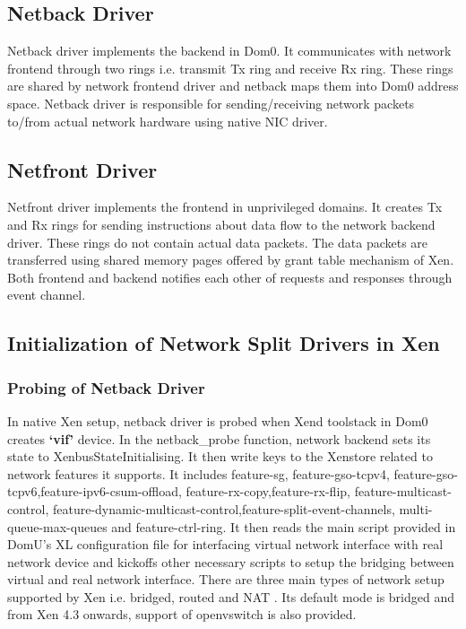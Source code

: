 \subsection{Netback Driver \label{sec:netback}}
Netback driver implements the backend in Dom0. It communicates with network frontend through two rings i.e. transmit Tx ring and receive Rx ring. These rings are shared by network frontend driver and netback maps them into Dom0 address space. Netback driver is responsible for sending/receiving network packets to/from actual network hardware using native NIC driver. 

\subsection{Netfront Driver \label{sec:netfront}}
Netfront driver implements the frontend in unprivileged domains. It creates Tx and Rx rings for sending instructions about data flow to the network backend driver. These rings do not contain actual data packets. The data packets are transferred using shared memory pages offered by grant table mechanism of Xen. Both frontend and backend notifies each other of requests and responses through event channel.

\subsection{Initialization of Network Split Drivers in Xen \label{sec:initnet}}
\subsubsection{Probing of Netback Driver}
In native Xen setup, netback driver is probed when Xend toolstack in Dom0 creates \textbf{`vif'} device. In the netback\_probe function, network backend sets its state to XenbusStateInitialising. It then write keys to the Xenstore related to network features it supports. It includes feature-sg, feature-gso-tcpv4, feature-gso-tcpv6,feature-ipv6-csum-offload, feature-rx-copy,feature-rx-flip, feature-multicast-control, feature-dynamic-multicast-control,feature-split-event-channels, multi-queue-max-queues and feature-ctrl-ring. It then reads the main script provided in DomU's XL configuration file for interfacing virtual network interface with real network device and kickoffs other necessary scripts to setup the bridging between virtual and real network interface. There are three main types of network setup supported by Xen i.e. bridged, routed and NAT \cite{xen_network}. Its default mode is bridged and from Xen 4.3 onwards, support of openvswitch is also provided.
